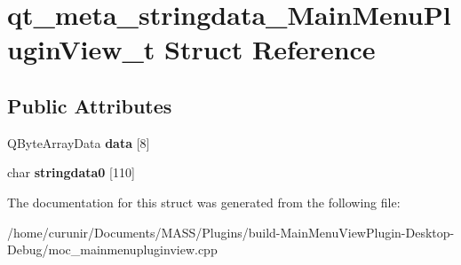 \hypertarget{structqt__meta__stringdata___main_menu_plugin_view__t}{}\section{qt\+\_\+meta\+\_\+stringdata\+\_\+\+Main\+Menu\+Plugin\+View\+\_\+t Struct Reference}
\label{structqt__meta__stringdata___main_menu_plugin_view__t}
\subsection*{Public Attributes}
\begin{DoxyCompactItemize}
\item 
Q\+Byte\+Array\+Data {\bfseries data} \mbox{[}8\mbox{]}\hypertarget{structqt__meta__stringdata___main_menu_plugin_view__t_ac70f82887e71e21309a9b80f0e3ceefc}{}\label{structqt__meta__stringdata___main_menu_plugin_view__t_ac70f82887e71e21309a9b80f0e3ceefc}

\item 
char {\bfseries stringdata0} \mbox{[}110\mbox{]}\hypertarget{structqt__meta__stringdata___main_menu_plugin_view__t_a79971d790269f5b9e01072043dff36be}{}\label{structqt__meta__stringdata___main_menu_plugin_view__t_a79971d790269f5b9e01072043dff36be}

\end{DoxyCompactItemize}


The documentation for this struct was generated from the following file\+:\begin{DoxyCompactItemize}
\item 
/home/curunir/\+Documents/\+M\+A\+S\+S/\+Plugins/build-\/\+Main\+Menu\+View\+Plugin-\/\+Desktop-\/\+Debug/moc\+\_\+mainmenupluginview.\+cpp\end{DoxyCompactItemize}
